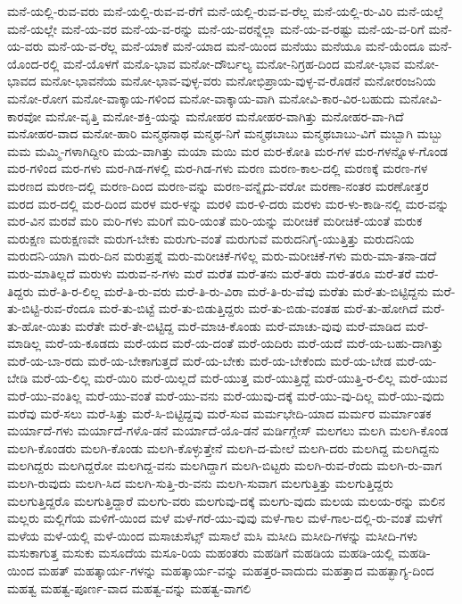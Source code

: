 {ಮನೆ-ಯಲ್ಲಿ-ರುವ-ವರು
ಮನೆ-ಯಲ್ಲಿ-ರುವ-ವ-ರೆಗೆ
ಮನೆ-ಯಲ್ಲಿ-ರುವ-ವ-ರೆಲ್ಲ
ಮನೆ-ಯಲ್ಲಿ-ರು-ವಿರಿ
ಮನೆ-ಯಲ್ಲೆ
ಮನೆ-ಯಲ್ಲೇ
ಮನೆ-ಯ-ವರ
ಮನೆ-ಯ-ವ-ರನ್ನು
ಮನೆ-ಯ-ವರನ್ನೆಲ್ಲಾ
ಮನೆ-ಯ-ವ-ರಷ್ಟು
ಮನೆ-ಯ-ವ-ರಿಗೆ
ಮನೆ-ಯ-ವರು
ಮನೆ-ಯ-ವ-ರೆಲ್ಲ
ಮನೆ-ಯಾಕೆ
ಮನೆ-ಯಾದ
ಮನೆ-ಯಿಂದ
ಮನೆಯು
ಮನೆಯೂ
ಮನೆ-ಯೆಂದೂ
ಮನೆ-ಯೊಂದ-ರಲ್ಲಿ
ಮನೆ-ಯೊಳಗೆ
ಮನೊ-ಭಾವ
ಮನೋ-ದೌರ್ಬಲ್ಯ
ಮನೋ-ನಿಗ್ರಹ-ದಿಂದ
ಮನೋ-ಭಾವ
ಮನೋ-ಭಾವದ
ಮನೋ-ಭಾವನೆಯ
ಮನೋ-ಭಾವ-ವುಳ್ಳ-ವರು
ಮನೋಭಿಪ್ರಾಯ-ವುಳ್ಳ-ವ-ರೊಡನೆ
ಮನೋರಂಜನಿಯ
ಮನೋ-ರೋಗ
ಮನೋ-ವಾಕ್ಕಾಯ-ಗಳಿಂದ
ಮನೋ-ವಾಕ್ಕಾಯ-ವಾಗಿ
ಮನೋವಿ-ಕಾರ-ವಿರ-ಬಹುದು
ಮನೋವಿ-ಕಾರವೋ
ಮನೋ-ವೃತ್ತಿ
ಮನೋ-ಶಕ್ತಿ-ಯನ್ನು
ಮನೋಹರ
ಮನೋಹರ-ವಾಗಿತ್ತು
ಮನೋಹರ-ವಾ-ಗಿದೆ
ಮನೋಹರ-ವಾದ
ಮನೋ-ಹಾರಿ
ಮನ್ಮಥನಾಥ
ಮನ್ಮಥ-ನಿಗೆ
ಮನ್ಮಥಬಾಬು
ಮನ್ಮಥಬಾಬು-ವಿಗೆ
ಮಬ್ಬಾಗಿ
ಮಬ್ಬು
ಮಮ
ಮಮ್ಮಿ-ಗಳಾಗಿದ್ದೀರಿ
ಮಯ-ವಾಗಿತ್ತು
ಮಯಾ
ಮಯಿ
ಮರ
ಮರ-ಕೋತಿ
ಮರ-ಗಳ
ಮರ-ಗಳನ್ನೊಳ-ಗೊಂಡ
ಮರ-ಗಳಿಂದ
ಮರ-ಗಳು
ಮರ-ಗಿಡ-ಗಳಲ್ಲಿ
ಮರ-ಗಿಡ-ಗಳು
ಮರಣ
ಮರಣ-ಕಾಲ-ದಲ್ಲಿ
ಮರಣಕ್ಕೆ
ಮರಣ-ಗಳ
ಮರಣದ
ಮರಣ-ದಲ್ಲಿ
ಮರಣ-ದಿಂದ
ಮರಣ-ವನ್ನು
ಮರಣ-ವನ್ನೈದು-ವರೋ
ಮರಣಾ-ನಂತರ
ಮರಣೋತ್ತರ
ಮರದ
ಮರ-ದಲ್ಲಿ
ಮರ-ದಿಂದ
ಮರಳ
ಮರ-ಳನ್ನು
ಮರಳಿ
ಮರ-ಳಿ-ದರು
ಮರಳು
ಮರ-ಳು-ಕಾಡಿ-ನಲ್ಲಿ
ಮರ-ವನ್ನು
ಮರ-ವಿನ
ಮರವೆ
ಮರಿ
ಮರಿ-ಗಳು
ಮರಿಗೆ
ಮರಿ-ಯಂತೆ
ಮರಿ-ಯನ್ನು
ಮರೀಚಿಕೆ
ಮರೀಚಿಕೆ-ಯಂತೆ
ಮರುಕ
ಮರುಕ್ಷಣ
ಮರುಕ್ಷಣವೇ
ಮರುಗ-ಬೇಕು
ಮರುಗು-ವಂತೆ
ಮರುಗುವೆ
ಮರುದನಿಗೈ-ಯುತ್ತಿತ್ತು
ಮರುದನಿಯ
ಮರುದನಿ-ಯಾಗಿ
ಮರು-ದಿನ
ಮರುಪ್ರಶ್ನೆ
ಮರು-ಮರೀಚಿಕೆ-ಗಳಿಲ್ಲ
ಮರು-ಮರೀಚಿಕೆ-ಗಳು
ಮರು-ಮಾ-ತನಾ-ಡದೆ
ಮರು-ಮಾತಿಲ್ಲದೆ
ಮರುಳು
ಮರುವ-ನ-ಗಳು
ಮರೆ
ಮರೆತ
ಮರೆ-ತನು
ಮರೆ-ತರು
ಮರೆ-ತರೂ
ಮರೆ-ತರೆ
ಮರೆ-ತಿದ್ದರು
ಮರೆ-ತಿ-ರ-ಲಿಲ್ಲ
ಮರೆ-ತಿ-ರು-ವರು
ಮರೆ-ತಿ-ರು-ವಿರಾ
ಮರೆ-ತಿ-ರು-ವೆವು
ಮರೆತು
ಮರೆ-ತು-ಬಿಟ್ಟಿದ್ದನು
ಮರೆ-ತು-ಬಿಟ್ಟಿ-ರುವ-ರೆಂದೂ
ಮರೆ-ತು-ಬಿಟ್ಟೆ
ಮರೆ-ತು-ಬಿಡುತ್ತಿದ್ದರು
ಮರೆ-ತು-ಬಿಡು-ವಂತಹ
ಮರೆ-ತು-ಹೋಗಿದೆ
ಮರೆ-ತು-ಹೋ-ಯಿತು
ಮರೆತೇ
ಮರೆ-ತೇ-ಬಿಟ್ಟಿದ್ದ
ಮರೆ-ಮಾಚಿ-ಕೊಂಡು
ಮರೆ-ಮಾಚು-ವುವು
ಮರೆ-ಮಾಡಿದ
ಮರೆ-ಮಾಡಿಲ್ಲ
ಮರೆ-ಯ-ಕೂಡದು
ಮರೆ-ಯದ
ಮರೆ-ಯ-ದಂತೆ
ಮರೆ-ಯದಿರು
ಮರೆ-ಯದೆ
ಮರೆ-ಯ-ಬಹು-ದಾಗಿತ್ತು
ಮರೆ-ಯ-ಬಾ-ರದು
ಮರೆ-ಯ-ಬೇಕಾಗುತ್ತದೆ
ಮರೆ-ಯ-ಬೇಕು
ಮರೆ-ಯ-ಬೇಕೆಂದು
ಮರೆ-ಯ-ಬೇಡ
ಮರೆ-ಯ-ಬೇಡಿ
ಮರೆ-ಯ-ಲಿಲ್ಲ
ಮರೆ-ಯಿರಿ
ಮರೆ-ಯಿಲ್ಲದೆ
ಮರೆ-ಯುತ್ತ
ಮರೆ-ಯುತ್ತಿದ್ದೆ
ಮರೆ-ಯುತ್ತಿ-ರ-ಲಿಲ್ಲ
ಮರೆ-ಯುವ
ಮರೆ-ಯು-ವಂತಿಲ್ಲ
ಮರೆ-ಯು-ವಂತೆ
ಮರೆ-ಯು-ವನು
ಮರೆ-ಯುವು-ದಕ್ಕೆ
ಮರೆ-ಯು-ವು-ದಿಲ್ಲ
ಮರೆ-ಯು-ವುದು
ಮರೆವು
ಮರೆ-ಸಲು
ಮರೆ-ಸಿತ್ತು
ಮರೆ-ಸಿ-ಬಿಟ್ಟಿದ್ದವು
ಮರೆ-ಸುವ
ಮರ್ಮಭೇದಿ-ಯಾದ
ಮರ್ಮರ
ಮರ್ಮಾಂತಕ
ಮರ್ಯಾದೆ-ಗಳು
ಮರ್ಯಾದೆ-ಗಳೊ-ಡನೆ
ಮರ್ಯಾದೆ-ಯೊ-ಡನೆ
ಮರ್ಡಿಗ್ಲೇಸ್
ಮಲಗಲು
ಮಲಗಿ
ಮಲಗಿ-ಕೊಂಡ
ಮಲಗಿ-ಕೊಂಡರು
ಮಲಗಿ-ಕೊಂಡು
ಮಲಗಿ-ಕೊಳ್ಳುತ್ತೇನೆ
ಮಲಗಿ-ದ-ಮೇಲೆ
ಮಲಗಿ-ದರು
ಮಲಗಿದ್ದ
ಮಲಗಿದ್ದನು
ಮಲಗಿದ್ದರು
ಮಲಗಿದ್ದರೋ
ಮಲಗಿದ್ದ-ವನು
ಮಲಗಿದ್ದಾಗ
ಮಲಗಿ-ಬಿಟ್ಟರು
ಮಲಗಿ-ರುವ-ರೆಂದು
ಮಲಗಿ-ರು-ವಾಗ
ಮಲಗಿ-ರುವುದು
ಮಲಗಿ-ಸಿದ
ಮಲಗಿ-ಸುತ್ತಿ-ರು-ವನು
ಮಲಗಿ-ಸುವಾಗ
ಮಲಗುತ್ತಿತ್ತು
ಮಲಗುತ್ತಿದ್ದರು
ಮಲಗುತ್ತಿದ್ದರೊ
ಮಲಗುತ್ತಿದ್ದಾರೆ
ಮಲಗು-ವರು
ಮಲಗುವು-ದಕ್ಕೆ
ಮಲಗು-ವುದು
ಮಲಯ
ಮಲಯ-ರನ್ನು
ಮಲಿನ
ಮಲ್ಲರು
ಮಲ್ಲಿಗೆಯ
ಮಳಿಗೆ-ಯಿಂದ
ಮಳೆ
ಮಳೆ-ಗರೆ-ಯು-ವುವು
ಮಳೆ-ಗಾಲ
ಮಳೆ-ಗಾಲ-ದಲ್ಲಿ-ರು-ವಂತೆ
ಮಳೆಗೆ
ಮಳೆಯ
ಮಳೆ-ಯಲ್ಲಿ
ಮಳೆ-ಯಿಂದ
ಮಸಾಚುಸೆಟ್ಸ್
ಮಸಾಲೆ
ಮಸಿ
ಮಸೀದಿ
ಮಸೀದಿ-ಗಳನ್ನು
ಮಸೀದಿ-ಗಳು
ಮಸುಕಾಗುತ್ತ
ಮಸುಕು
ಮಸೂದೆಯ
ಮಸೂ-ರಿಯ
ಮಹಂತರು
ಮಹಡಿಗೆ
ಮಹಡಿಯ
ಮಹಡಿ-ಯಲ್ಲಿ
ಮಹಡಿ-ಯಿಂದ
ಮಹತ್
ಮಹತ್ಕಾರ್ಯ-ಗಳನ್ನು
ಮಹತ್ಕಾರ್ಯ-ವನ್ನು
ಮಹತ್ತರ-ವಾದುದು
ಮಹತ್ತಾದ
ಮಹತ್ಭಾಗ್ಯ-ದಿಂದ
ಮಹತ್ವ
ಮಹತ್ವ-ಪೂರ್ಣ-ವಾದ
ಮಹತ್ವ-ವನ್ನು
ಮಹತ್ವ-ವಾಗಲಿ
}
